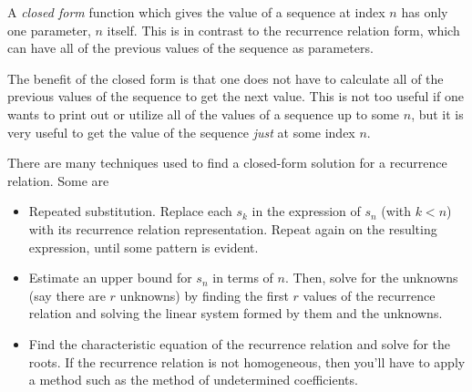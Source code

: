 \documentclass[12pt]{article}
\begin{document}
A \emph{closed form} function which gives the value of a sequence at index $n$ has only one parameter, $n$ itself.  This is in contrast to the recurrence relation form, which can have all of the previous values of the sequence as parameters.

The benefit of the closed form is that one does not have to calculate all of the previous values of the sequence to get the next value.  This is not too useful if one wants to print out or utilize all of the values of a sequence up to some $n$, but it is very useful to get the value of the sequence \emph{just} at some index $n$.

There are many techniques used to find a closed-form solution for a recurrence relation.  Some are

\begin{itemize}
\item Repeated substitution.  Replace each $s_k$ in the expression of $s_n$ (with $k < n$) with its recurrence relation representation.  Repeat again on the resulting expression, until some pattern is evident.
\item Estimate an upper bound for $s_n$ in terms of $n$.  Then, solve for the unknowns (say there are $r$ unknowns) by finding the first $r$ values of the recurrence relation and solving the linear system formed by them and the unknowns.
\item Find the characteristic equation of the recurrence relation and solve for the roots.  If the recurrence relation is not homogeneous, then you'll have to apply a method such as the method of undetermined coefficients.
\end{itemize}
\end{document}
